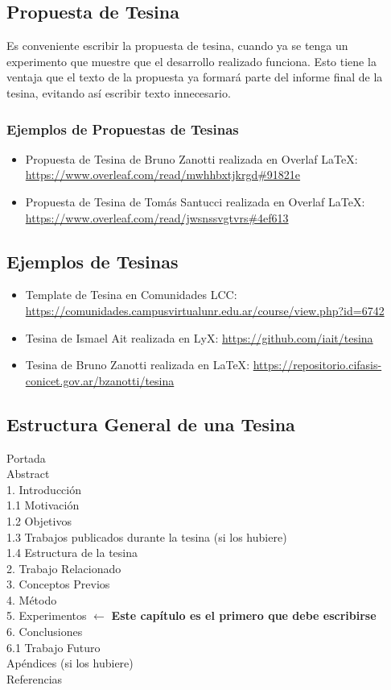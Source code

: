 \documentclass[a4paper,	11pt]{article}
\begin{document}
\subsection{Propuesta de Tesina}
Es conveniente escribir la propuesta de tesina, cuando ya se tenga un experimento que muestre que el desarrollo realizado funciona. Esto tiene la ventaja que el texto de la propuesta ya formará parte del informe final de la tesina, evitando así escribir texto innecesario.

\subsubsection{Ejemplos de Propuestas de Tesinas}
\begin{itemize}
    \item Propuesta de Tesina de Bruno Zanotti realizada en Overlaf {\LaTeX}: \url{https://www.overleaf.com/read/mwhhbxtjkrgd#91821e}
    \item Propuesta de Tesina de Tomás Santucci realizada en Overlaf {\LaTeX}: \url {https://www.overleaf.com/read/jwsnssvgtvrs#4ef613}
\end{itemize}

\subsection{Ejemplos de Tesinas}
\begin{itemize}
    \item Template de Tesina en Comunidades LCC: \url{https://comunidades.campusvirtualunr.edu.ar/course/view.php?id=6742}
    \item Tesina de Ismael Ait realizada en LyX: \url{https://github.com/iait/tesina}
    \item Tesina de Bruno Zanotti realizada en {\LaTeX}: \url{https://repositorio.cifasis-conicet.gov.ar/bzanotti/tesina}
\end{itemize}

\subsection{Estructura General de una Tesina}
Portada\\
Abstract\\
1. Introducción\\
1.1 Motivación\\
1.2 Objetivos\\
1.3 Trabajos publicados durante la tesina (si los hubiere)\\
1.4 Estructura de la tesina\\
2. Trabajo Relacionado\\
3. Conceptos Previos\\
4. Método\\
5. Experimentos $\leftarrow$ \textbf{Este capítulo es el primero que debe escribirse}\\
6. Conclusiones\\
6.1 Trabajo Futuro\\
Apéndices (si los hubiere)\\
Referencias
\end{document}
